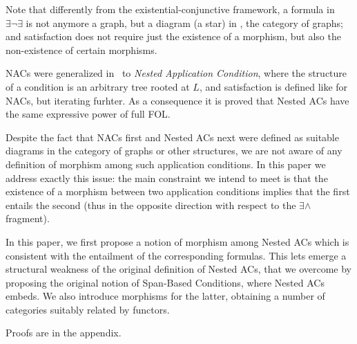 Note that differently from the existential-conjunctive framework, a formula in $\exists \neg \exists$ is not anymore a graph, but a diagram (a star) in , the category of graphs; and satisfaction does not require just the existence of a morphism, but also the non-existence of certain morphisms.

NACs were generalized in~\cite{Rensink-FOL,Habel-FOL} to \emph{Nested Application Condition}, where the structure of a condition is an arbitrary tree rooted at $L$, and satisfaction is defined like for NACs, but iterating furhter. As a consequence it is proved that Nested ACs have the same expressive power of full FOL.

Despite the fact that NACs first and Nested ACs next were defined as suitable diagrams in the category of graphs or other structures, we are not aware of any definition of morphism among such application conditions. In this paper we address exactly this issue: the main constraint we intend to meet is that the existence of a morphism between two application conditions implies that the first entails the second (thus in the opposite direction with respect to the $\exists\wedge$ fragment).
 
\medskip\noindent
In this paper, we first propose a notion of morphism among Nested ACs which is consistent with the entailment of the corresponding formulas. This lets emerge
a structural weakness of the original definition of Nested ACs, that we overcome by proposing the original notion of Span-Based Conditions, where Nested ACs embeds. We also introduce morphisms for the latter, obtaining a number of categories suitably related by functors. 

Proofs are in the appendix.
 
 